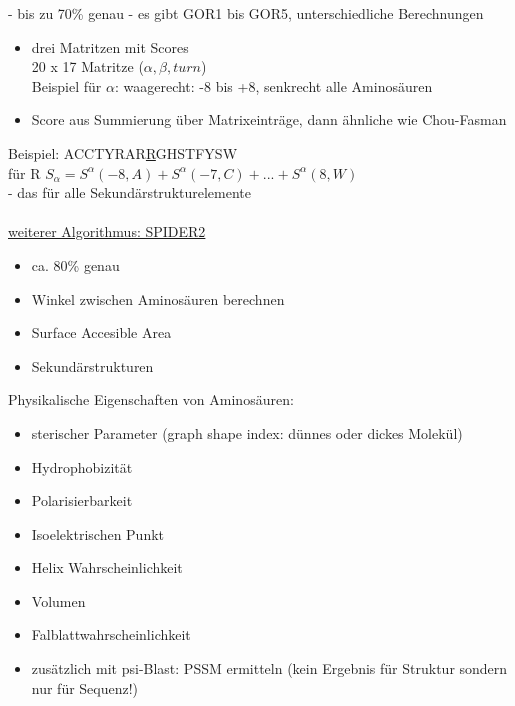  - bis zu 70\% genau
 - es gibt GOR1 bis GOR5, unterschiedliche Berechnungen
\begin{itemize}
	\item drei Matritzen mit Scores\\
	20 x 17 Matritze ($\alpha, \beta, turn$)\\
	Beispiel für $\alpha$: waagerecht: -8 bis +8, senkrecht alle Aminosäuren
	\item Score aus Summierung über Matrixeinträge, dann ähnliche wie Chou-Fasman
\end{itemize}

Beispiel: ACCTYRAR\underline{R}GHSTFYSW\\
für R
$S_{\alpha}=S^{\alpha}(-8,A) + S^{\alpha}(-7,C) + ... + S^{\alpha}(8,W)$\\
 - das für alle Sekundärstrukturelemente
\\\\
\underline{weiterer Algorithmus: SPIDER2}
\begin{itemize}
	\item ca. 80\% genau
	\item Winkel zwischen Aminosäuren berechnen
	\item Surface Accesible Area
	\item Sekundärstrukturen
\end{itemize}

Physikalische Eigenschaften von Aminosäuren:\\
\begin{itemize}
	\item sterischer Parameter (graph shape index: dünnes oder dickes Molekül)
	\item Hydrophobizität
	\item Polarisierbarkeit
	\item Isoelektrischen Punkt
	\item Helix Wahrscheinlichkeit
	\item Volumen
	\item Falblattwahrscheinlichkeit
	\item zusätzlich mit psi-Blast: PSSM ermitteln (kein Ergebnis für Struktur sondern nur für Sequenz!)
\end{itemize}

